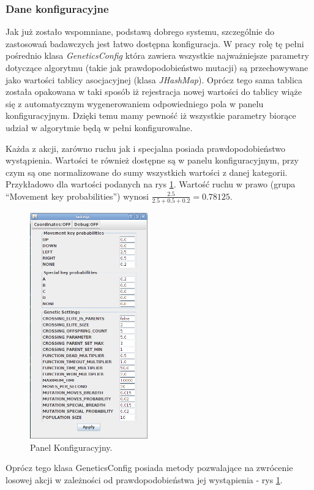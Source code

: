 \subsubsection{Dane konfiguracyjne}
\begin{par}
	Jak już zostało wspomniane, podstawą dobrego systemu, szczególnie do zastosowań badawczych jest łatwo dostępna konfiguracja. 
	W pracy rolę tę pełni pośrednio klasa \textit{GeneticsConfig} która zawiera wszystkie najważniejsze parametry dotyczące algorytmu (takie jak prawdopodobieństwo mutacji) są przechowywane jako wartości tablicy asocjacyjnej (klasa \textit{JHashMap}). 
	Oprócz tego sama tablica została opakowana w taki sposób iż rejestracja nowej wartości do tablicy wiąże się z automatycznym wygenerowaniem odpowiedniego pola w panelu konfiguracyjnym. 
	Dzięki temu mamy pewność iż wszystkie parametry biorące udział w algorytmie będą w pełni konfigurowalne.
\end{par}
\begin{par}
	Każda z akcji, zarówno ruchu jak i specjalna posiada prawdopodobieństwo wystąpienia.
	Wartości te również dostępne są w panelu konfiguracyjnym, przy czym są one normalizowane do sumy wszystkich wartości z danej kategorii.
	Przykładowo dla wartości podanych na rys \ref{fig:config1}. Wartość ruchu w prawo (grupa ``Movement key probabilities'') wynosi $\frac{2.5}{2.5+0.5+0.2}=0.78125$.
	\begin{figure}[!h]
		\centering
		\includegraphics[width=2in]{obrazki/config1.png}
		\caption{Panel Konfiguracyjny.}
		\label{fig:config1}
	\end{figure}
	Oprócz tego klasa GeneticsConfig posiada metody pozwalające na zwrócenie losowej akcji w zależności od prawdopodobieństwa jej wystąpienia - rys \ref{fig:config1}.
\end{par}

